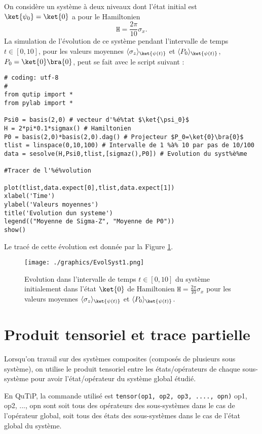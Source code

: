 \begin{example}
On considère un système à deux niveaux dont l'état initial est 
$\ket{\psi_0}=\ket{0}$ a pour le Hamiltonien
\begin{equation}
\mathtt{H} = \frac{2\pi}{10}\sigma_x.
\end{equation}
La simulation de l'évolution de ce système pendant l'intervalle de temps 
$t\in[0,10]$, pour les valeurs moyennes $\av{\sigma_z}_{\ket{\psi(t)}}$ et 
$\av{P_0}_{\ket{\psi(t)}}$, $P_0=\ket{0}\bra{0}$, peut se fait avec le 
script suivant :
\end{example}
\begin{lstlisting}[commentstyle=\scriptsize]
# coding: utf-8 
#
from qutip import *
from pylab import *

Psi0 = basis(2,0) # vecteur d'%é%tat $\ket{\psi_0}$
H = 2*pi*0.1*sigmax() # Hamiltonien
P0 = basis(2,0)*basis(2,0).dag() # Projecteur $P_0=\ket{0}\bra{0}$
tlist = linspace(0,10,100) # Intervalle de 1 %à% 10 par pas de 10/100
data = sesolve(H,Psi0,tlist,[sigmaz(),P0]) # Evolution du syst%è%me

#Tracer de l'%é%volution

plot(tlist,data.expect[0],tlist,data.expect[1])
xlabel('Time')
ylabel('Valeurs moyennes')
title('Evolution dun systeme')
legend(("Moyenne de Sigma-Z", "Moyenne de P0"))
show()
\end{lstlisting}
Le tracé de cette évolution est donnée par la Figure 
\ref{fig:EvolSyst1}.
\begin{figure}[htbp]
\centering
 \texttt{[image: ./graphics/EvolSyst1.png]}
 \caption{Evolution dans l'intervalle de temps $t\in[0,10]$ du système 
initialement dans l'état $\ket{0}$ de Hamiltonien $\mathtt{H} = 
\frac{2\pi}{10}\sigma_x$ pour les valeurs moyennes 
$\av{\sigma_z}_{\ket{\psi(t)}}$ et $\av{P_0}_{\ket{\psi(t)}}$.}
 \label{fig:EvolSyst1}
\end{figure}


\section{Produit tensoriel et trace partielle}

Lorsqu'on travail sur des systèmes composites (composés de plusieurs sous 
système), on utilise le produit tensoriel entre les états/opérateurs de chaque 
sous-système pour avoir l'état/opérateur du système global étudié.

En QuTiP, la commande utilisé est \texttt{tensor(op1, op2, op3, ...., opn)} 
op1, op2, ..., opn sont soit tous des opérateurs des sous-systèmes dans le cas 
de l'opérateur global, soit tous des états des sous-systèmes dans le cas de 
l'état global du système.

